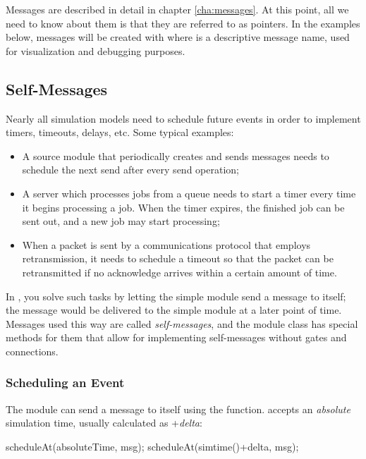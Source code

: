 Messages are described in detail in chapter \ref{cha:messages}.
At this point, all we need to know about them is that they are
referred to as  pointers. In the examples below,
messages will be created with  where
 is a descriptive message name, used for visualization
and debugging purposes.


\subsection{Self-Messages}
\label{sec:ch-simple-modules:self-messages}

Nearly all simulation models need to schedule future events in order
to implement timers, timeouts, delays, etc. Some typical examples:

\begin{itemize}
  \item A source module that periodically creates and sends messages
    needs to schedule the next send after every send operation;
  \item A server which processes jobs from a queue needs to start
    a timer every time it begins processing a job. When the timer
    expires, the finished job can be sent out, and a new job may
    start processing;
  \item When a packet is sent by a communications protocol that employs
    retransmission, it needs to schedule a timeout so that the packet
    can be retransmitted if no acknowledge arrives within a certain
    amount of time.
\end{itemize}

In {\opp}, you solve such tasks by letting the simple module send a message
to itself; the message would be delivered to the simple module at a later
point of time. Messages used this way are called
\textit{self-messages}, and the module class has
special methods for them that allow for implementing self-messages without
gates and connections.

\subsubsection{Scheduling an Event}

The module can send a message to itself using the  function.
 accepts an \textit{absolute} simulation time,
usually calculated as +\textit{delta}:

\begin{cpp}
scheduleAt(absoluteTime, msg);
scheduleAt(simtime()+delta, msg);
\end{cpp}

